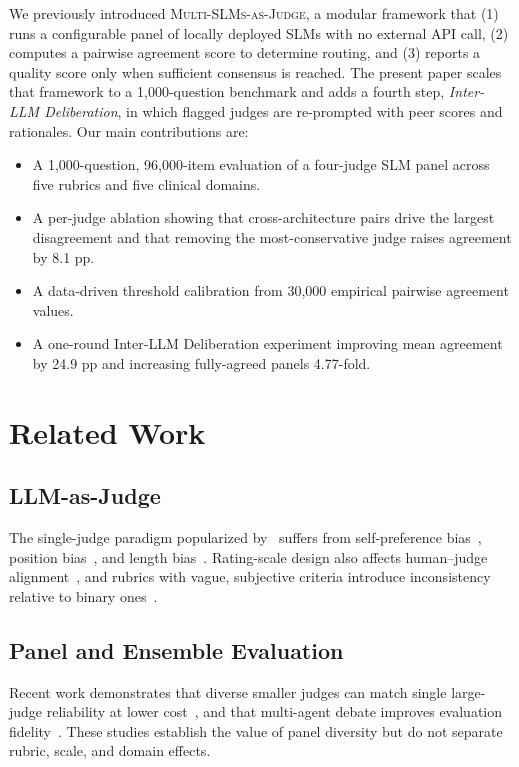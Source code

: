 \documentclass[conference]{IEEEtran}
\begin{document}
We previously introduced \textsc{Multi-SLMs-as-Judge}, a modular
framework that (1) runs a configurable panel of locally deployed
SLMs with no external API call, (2) computes a pairwise agreement
score to determine routing, and (3) reports a quality score only
when sufficient consensus is reached. The present paper scales that
framework to a 1,000-question benchmark and adds a fourth step,
\emph{Inter-LLM Deliberation}, in which flagged judges are
re-prompted with peer scores and rationales. Our main contributions
are:
\begin{itemize}
  \item A 1,000-question, 96,000-item evaluation of a four-judge
        SLM panel across five rubrics and five clinical domains.
  \item A per-judge ablation showing that cross-architecture pairs
        drive the largest disagreement and that removing the
        most-conservative judge raises agreement by 8.1 pp.
  \item A data-driven threshold calibration from 30,000 empirical
        pairwise agreement values.
  \item A one-round Inter-LLM Deliberation experiment improving mean
        agreement by 24.9 pp and increasing fully-agreed panels
        4.77-fold.
\end{itemize}

\section{Related Work}

\subsection{LLM-as-Judge}
The single-judge paradigm popularized by~\cite{zheng2023judging}
suffers from self-preference bias~\cite{panickssery2024llm},
position bias~\cite{shi2025judging}, and length
bias~\cite{zheng2024large}. Rating-scale design also affects
human--judge alignment~\cite{li2026grading}, and rubrics with vague,
subjective criteria introduce inconsistency relative to binary
ones~\cite{mallinar2026scalable}.

\subsection{Panel and Ensemble Evaluation}
Recent work demonstrates that diverse smaller judges can match
single large-judge reliability at lower cost~\cite{verga2024replacing},
and that multi-agent debate improves evaluation
fidelity~\cite{li2026medjudge}. These studies establish the value of
panel diversity but do not separate rubric, scale, and domain
effects.
\end{document}
